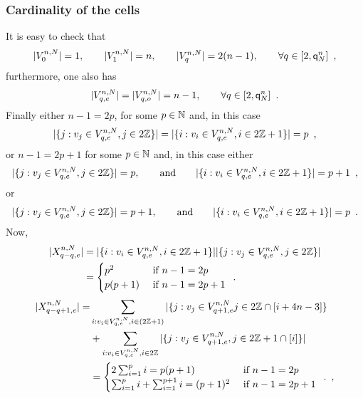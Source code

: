 \subsubsection*{Cardinality of the cells}
It is easy to check that 
\[
|V_{0}^{n,N}|=1, \qquad |V_{1}^{n,N}|=n,\qquad |V_{q}^{n,N}|=2(n-1),\qquad\forall q\in[2,{\mathsf{q}}^{n}_{N}]\enspace,
\]
furthermore, one also has
\[
|V_{q,e}^{n,N}|=|V_{q,o}^{n,N}|=n-1,\qquad \forall q\in [2,{\mathsf{q}}^{n}_{N}]\enspace.
\]
Finally either $n-1=2p$, for some $p\in \mathbb{N}$ and, in this case 
\[
|\{j: v_j\in V_{q,e}^{n,N},j\in 2\mathbb{Z}\}|=|\{i : v_i\in V_{q,e}^{n,N},i\in 2\mathbb{Z}+1\}|=p\enspace,
\]
or $n-1=2p+1$ for some $p\in \mathbb{N}$ and, in this case either 
\[
|\{j: v_j\in V_{q,e}^{n,N},j\in 2\mathbb{Z}\}|=p,\qquad\text{and}\qquad |\{i : v_i\in V_{q,e}^{n,N},i\in 2\mathbb{Z}+1\}|=p+1\enspace,
\]
or 
\[
|\{j: v_j\in V_{q,e}^{n,N},j\in 2\mathbb{Z}\}|=p+1,\qquad\text{and}\qquad |\{i : v_i\in V_{q,e}^{n,N},i\in 2\mathbb{Z}+1\}|=p\enspace.
\]
Now,
\begin{align*}
|X_{q- q,e}^{n,N}|&=|\{i : v_i\in V_{q,e}^{n,N},i\in 2\mathbb{Z}+1\}||\{j: v_j\in V_{q,e}^{n,N},j\in 2\mathbb{Z}\}|\\
&=
\begin{cases}
 p^2&\text{ if }n-1=2p\\
 p(p+1)&\text{ if }n-1=2p+1
\end{cases}
\enspace. 
\end{align*}
\begin{align*}
|X_{q- q+1,e}^{n,N}|=&\sum_{i : v_i\in V_{q,e}^{n,N},i\in(2\mathbb{Z}+1)}|\{j : v_j\in V_{q+1,e}^{n,N}j\in 2\mathbb{Z}\cap [i+4n-3]\}\\
&+\sum_{i : v_i\in V_{q,e}^{n,N},i\in 2\mathbb{Z}}|\{j: v_j\in V_{q+1,e}^{n,N},j\in 2\mathbb{Z}+1\cap [i]\}|\\
&=
\begin{cases}
2\sum_{i=1}^pi=p(p+1) &\text{ if }n-1=2p\\
\sum_{i=1}^pi+\sum_{i=1}^{p+1}i=(p+1)^2 &\text{ if }n-1=2p+1
\end{cases}
\enspace.
\enspace,
\end{align*}

